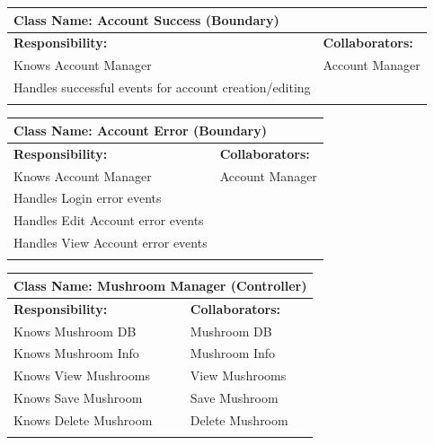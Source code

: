\documentclass[]{article}
\begin{document}
\begin{itemize}
        \begin{table}[ht]
		\centering
		\begin{tabular}{|p{6cm}|p{6cm}|}
		\hline 
		\multicolumn{2}{|l|}{\textbf{Class Name: Account Success (Boundary)}} \\
		\hline
		\textbf{Responsibility:} & \textbf{Collaborators:} \\
		\hline
		Knows Account Manager & Account Manager\\
            Handles successful events for account creation/editing & \\
		\vspace{1in} & \\
		\hline
		\end{tabular}
	\end{table}

        \begin{table}[ht]
		\centering
		\begin{tabular}{|p{6cm}|p{6cm}|}
		\hline 
		\multicolumn{2}{|l|}{\textbf{Class Name: Account Error (Boundary)}} \\
		\hline
		\textbf{Responsibility:} & \textbf{Collaborators:} \\
		\hline
		Knows Account Manager & Account Manager\\
            Handles Login error events \\
            Handles Edit Account error events \\
            Handles View Account error events \\
		\vspace{1in} & \\
		\hline
		\end{tabular}
	\end{table}

     \begin{table}[ht]
		\centering
		\begin{tabular}{|p{6cm}|p{6cm}|}
		\hline 
		\multicolumn{2}{|l|}{\textbf{Class Name: Mushroom Manager (Controller)}} \\
		\hline
		\textbf{Responsibility:} & \textbf{Collaborators:} \\
		\hline
            Knows Mushroom DB & Mushroom DB\\
		Knows Mushroom Info & Mushroom Info\\
		Knows View Mushrooms & View Mushrooms\\
            Knows Save Mushroom & Save Mushroom\\
		Knows Delete Mushroom & Delete Mushroom\\
		\vspace{1in} & \\
		\hline
		\end{tabular}
	\end{table}


\end{itemize}
\end{document}
